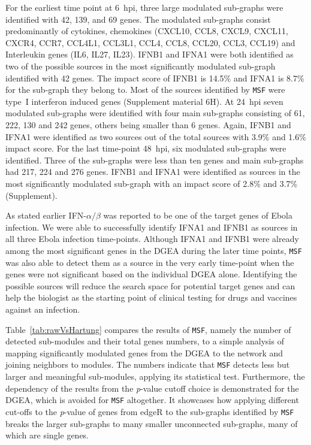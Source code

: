 \documentclass[10pt,a4paper,twocolumn]{article}
\begin{document}
	For the earliest time point at 6~hpi, three large modulated sub-graphs were identified with 42,
	139, and 69 genes.
	The modulated sub-graphs consist predominantly of cytokines, chemokines
	(CXCL10, CCL8, CXCL9, CXCL11, CXCR4, CCR7, CCL4L1, CCL3L1, CCL4, CCL8, CCL20, CCL3, CCL19) and Interleukin genes (IL6, IL27, IL23).
	IFNB1 and IFNA1 were both identified as two of the possible sources
	in the most significantly modulated sub-graph identified with 42 genes. The impact score of IFNB1 is 14.5\% and IFNA1 is 8.7\% for the sub-graph they belong to.
	Most of the sources identified by \texttt{MSF} were
	type~I interferon induced genes (Supplement material 6H).
	At 24~hpi seven modulated sub-graphs were
	identified with four main sub-graphs consisting
	of 61, 222, 130 and 242 genes, others being smaller than 6 genes. Again, IFNB1
	and IFNA1 were identified as two sources out of the total sources with 3.9\% and 1.6\% impact score. For the last time-point 48~hpi,
	six modulated sub-graphs were identified. Three of the sub-graphs were
	less than ten genes and main sub-graphs had 217, 224 and 276 genes. IFNB1 and IFNA1 were identified as sources in
	the most significantly modulated sub-graph with an impact score of 2.8\% and 3.7\% (Supplement).
	
	As stated earlier IFN-$\alpha / \beta$ was reported to be one of the target
	genes of Ebola infection. We were able to successfully identify IFNA1 and IFNB1 as
	sources in all three Ebola infection time-points. Although IFNA1 and IFNB1 were already among the most
	significant genes in the DGEA during the later time points, \texttt{MSF} was
	also able to detect them as a source in the very early time-point when the
	genes were not significant based on the individual DGEA alone. Identifying
	the possible sources will reduce the search space for potential target
	genes and can help the biologist as the starting point of clinical testing
	for drugs and vaccines against an infection.
	
	Table~\ref{tab:rawVsHartung} compares the results of \texttt{MSF}, namely
	the number of detected sub-modules and their total genes numbers, to a
	simple analysis of mapping significantly modulated genes from the DGEA to
	the network and joining neighbors to modules. The numbers indicate that
	\texttt{MSF} detects less but larger and meaningful sub-modules, applying its statistical
	test. Furthermore, the dependency of the results from the \textit{p}-value cutoff
	choice is demonstrated for the DGEA, which is avoided for \texttt{MSF}
	altogether. It showcases how applying different cut-offs to the \textit{p}-value of genes from edgeR to the sub-graphs identified by \texttt{MSF} breaks the larger sub-graphs to many smaller unconnected sub-graphs, many of which are single genes.
	
\end{document}
